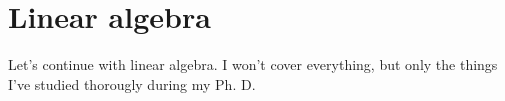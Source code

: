\section{Linear algebra}
    Let's continue with linear algebra. I won't cover everything, but only the things I've studied thorougly during my Ph. D.

    

    

    

    
